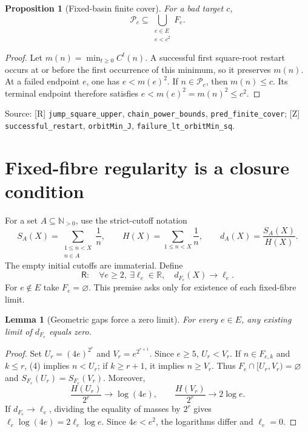 \documentclass[11pt,a4paper]{article}
\newtheorem{proposition}[theorem]{Proposition}
\newtheorem{lemma}[theorem]{Lemma}
\theoremstyle{definition}
\newcommand{\NN}{\mathbb N}
\newcommand{\RR}{\mathsf R}
\newcommand{\Pred}{\mathcal P}
\newcommand{\source}[1]{\par{\footnotesize\color{ink}Source: #1.}\par}
\begin{document}
\begin{proposition}[Fixed-basin finite cover]\label{prop:packet}
For a bad target $c$,
\[
 \Pred_c\subseteq\bigcup_{\substack{e\in E\\ e<c^2}}F_e.
 \tag{5}
\]
\end{proposition}
\begin{proof}
Let $m(n)=\min_{t\ge0}C^t(n)$. A successful first square-root
restart occurs at or before the first occurrence of this minimum, so it preserves $m(n)$.
At a failed endpoint $e$, one has $e<m(e)^2$. If $n\in\Pred_c$,
then $m(n)\le c$. Its terminal endpoint therefore satisfies
$e<m(e)^2=m(n)^2\le c^2$.
\end{proof}
\source{[R] \nolinkurl{jump_square_upper}, \nolinkurl{chain_power_bounds},
\nolinkurl{pred_finite_cover}; [Z] \nolinkurl{successful_restart},
\nolinkurl{orbitMin_J}, \nolinkurl{failure_lt_orbitMin_sq}}

\newpage
\section{Fixed-fibre regularity is a closure condition}
For a set $A\subseteq\NN_{>0}$, use the strict-cutoff notation
\[
 S_A(X)=\sum_{\substack{1\le n<X\\n\in A}}\frac1n,\qquad
 H(X)=\sum_{1\le n<X}\frac1n,\qquad d_A(X)=\frac{S_A(X)}{H(X)}.
\]
The empty initial cutoffs are immaterial. Define
\[
 \RR:\quad
 \forall e\ge2,\ \exists\ell_e\in\mathbb R,\quad
 d_{F_e}(X)\longrightarrow\ell_e.
 \tag{R}
\]
For $e\notin E$ take $F_e=\varnothing$. This premise asks only for
existence of each fixed-fibre limit.

\begin{lemma}[Geometric gaps force a zero limit]\label{lem:gap}
For every $e\in E$, any existing limit of $d_{F_e}$ equals zero.
\end{lemma}
\begin{proof}
Set $U_r=(4e)^{2^r}$ and $V_r=e^{2^{r+1}}$.
Since $e\ge5$, $U_r<V_r$. If $n\in F_{e,k}$ and $k\le r$, (4)
implies $n<U_r$; if $k\ge r+1$, it implies $n\ge V_r$.
Thus $F_e\cap[U_r,V_r)=\varnothing$ and
$S_{F_e}(U_r)=S_{F_e}(V_r)$. Moreover,
\[
 \frac{H(U_r)}{2^r}\longrightarrow\log(4e),\qquad
 \frac{H(V_r)}{2^r}\longrightarrow2\log e.
\]
If $d_{F_e}\to\ell_e$, dividing the equality of masses by $2^r$
gives $\ell_e\log(4e)=2\ell_e\log e$. Since $4e<e^2$,
the logarithms differ and $\ell_e=0$.
\end{proof}
\end{document}
